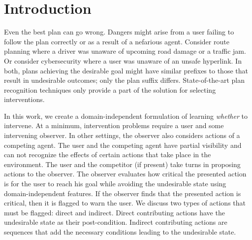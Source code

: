\documentclass[letterpaper]{article}
\theoremstyle{plain}
\begin{document}
\section{Introduction}\label{sec:intro}
Even the best plan can go wrong.
Dangers might arise from a user failing to follow the plan correctly or as a result of a nefarious agent.
Consider route planning where a driver was unaware of upcoming road damage or a traffic jam.  
Or consider cybersecurity where a user was unaware of an unsafe hyperlink.
In both, plans achieving the desirable goal might have similar prefixes to those that result in undesirable outcomes; only the plan suffix differs.
State-of-the-art plan recognition techniques only provide a part of the solution for selecting interventions.

In this work, we create a domain-independent formulation of learning \emph{whether} to intervene.
At a minimum, intervention problems require a user and some intervening observer.
In other settings, the observer also considers actions of a competing agent.
The user and the competing agent have partial visibility and can not recognize the effects of certain actions that take place in the environment.
The user and the competitor (if present) take turns in proposing actions to the observer. The observer evaluates how critical the presented action is for the user to reach his goal while avoiding the undesirable state using  domain-independent features. If the observer finds that the presented action is critical, then it is flagged to warn the user. We discuss two types of actions that must be flagged: direct and indirect. Direct contributing actions have the undesirable state as their post-condition. Indirect contributing actions are sequences that add the necessary conditions leading to the undesirable state.

\end{document}
